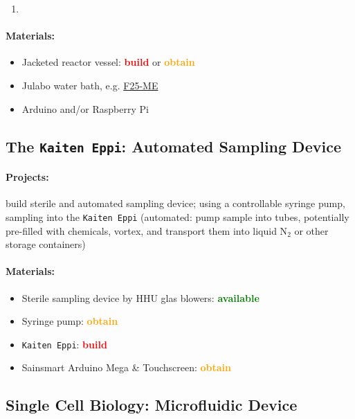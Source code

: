 \documentclass[12pt,a4paper]{scrartcl}
\newcommand{\obtain}[0]{\textcolor{orange}{\textbf{obtain}}}
\newcommand{\avail}[0]{\textcolor{green}{\textbf{available}}}
\newcommand{\build}[0]{\textcolor{red}{\textbf{build}}}
\begin{document}
\begin{enumerate}
\item
\end{enumerate}

\paragraph{Materials:}
\begin{itemize}
\item Jacketed reactor vessel: \build{} or \obtain{}
\item Julabo water bath,
e.g. \href{http://www.laborhandel24.de/9162625-de?utm_source=google_shopping&gclid=Cj0KEQiA496zBRDoi5OY3p2xmaUBEiQArLNnK6uWkryhjvkNdmRLgcg2W_HIO9W1aKaKCO9gmvlkt_MaAmhe8P8HAQ}{F25-ME}
\item Arduino and/or Raspberry Pi
\end{itemize}

\newpage
\subsection{The \texttt{Kaiten Eppi}: Automated Sampling Device} 
\label{sampling}
\paragraph{Projects:} build sterile and automated sampling device; using
a controllable syringe pump, sampling into the \texttt{Kaiten Eppi}
(automated: pump sample into tubes, potentially pre-filled with
chemicals, vortex, and transport them into liquid N$_2$ or other
storage containers)

\paragraph{Materials:}
\begin{itemize}
\item Sterile sampling device by HHU glas blowers: \avail{}
\item Syringe pump: \obtain{}
\item \texttt{Kaiten Eppi}: \build{}
\item Sainsmart Arduino Mega \& Touchscreen: \obtain{}
\end{itemize}


\newpage
\subsection{Single Cell Biology: Microfluidic Device} 
\label{micro}
\end{document}
